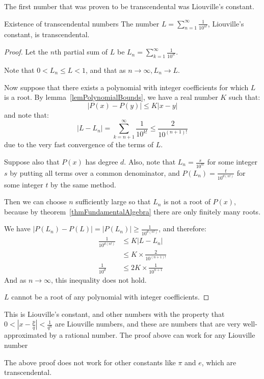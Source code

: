 \documentclass[../Main.tex]{subfiles}
\begin{document}
The first number that was proven to be transcendental was Liouville's constant.
\begin{theorem}{Existence of transcendental numbers}
    The number $L = \sum_{n=1}^{\infty} \frac{1}{10^{n!}}$, Liouville's constant, is transcendental.
\end{theorem}
\begin{proof}
    Let the $n$th partial sum of $L$ be $L_n = \sum_{k=1}^{\infty} \frac{1}{10^{k!}}$.\par
    Note that $0 < L_n \leq L < 1$, and that as $n \rightarrow \infty, L_n \rightarrow L$.\par
    Now suppose that there exists a polynomial with integer coefficients for which $L$ is a root. By lemma~\ref{lemPolynomialBounds}, we have a real number $K$ such that:
    \begin{equation*}
        |P(x) - P(y)| \leq K|x - y|
    \end{equation*}
    and note that:
    \begin{equation*}
        |L - L_n| = \sum_{k=n+1}^{\infty} \frac{1}{10^{k!}} \leq \frac{2}{10^{(n+1)!}}
    \end{equation*}
    due to the very fast convergence of the terms of $L$.\par
    Suppose also that $P(x)$ has degree $d$. Also, note that $L_n = \frac{s}{10^{n!}}$ for some integer $s$ by putting all terms over a common denominator, and $P(L_n) = \frac{t}{10^{d(n!)}}$ for some integer $t$ by the same method.\par
    Then we can choose $n$ sufficiently large so that $L_n$ is not a root of $P(x)$, because by theorem~\ref{thmFundamentalAlgebra} there are only finitely many roots.\par
    We have $|P(L_n) - P(L)| = |P(L_n)| \geq \frac{1}{10^{d(n!)}}$, and therefore:
    \begin{align*}
        \frac{1}{10^{d(n!)}} &\leq K|L-L_n| \\
        &\leq K \times \frac{2}{10^{(n+1)!}} \\
        \frac{1}{10^d} &\leq 2K \times \frac{1}{10^{n+1}}
    \end{align*}
    And as $n \rightarrow \infty$, this inequality does not hold.\contradiction\par
    $L$ cannot be a root of any polynomial with integer coefficients.
\end{proof}
\begin{remarks}
    \item This is Liouville's constant, and other numbers with the property that $0 < |x - \frac{p}{q}| < \frac{1}{q^n}$ are Liouville numbers, and these are numbers that are very well-approximated by a rational number. The proof above can work for any Liouville number
    \item The above proof does not work for other constants like $\pi$ and $e$, which are transcendental.
\end{remarks}
\end{document}
